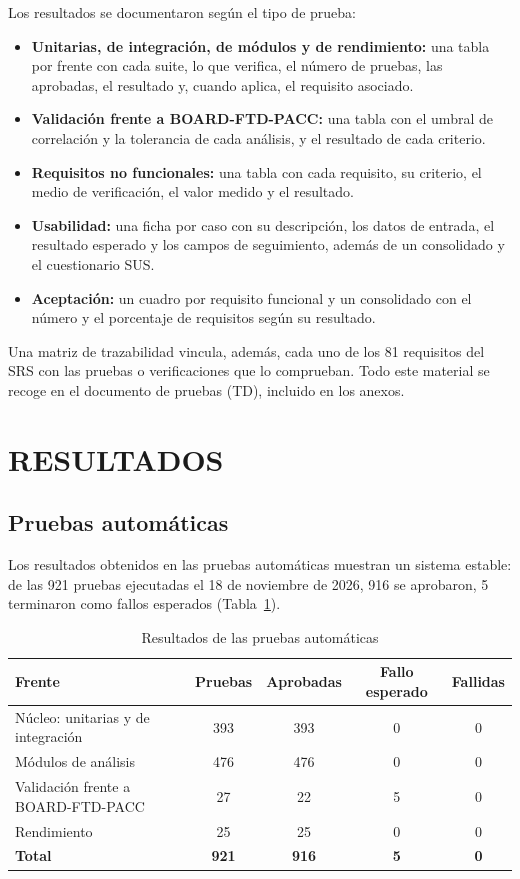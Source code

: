 \documentclass[12pt,letterpaper,oneside]{article}
\newcommand{\capitulo}[1]{\clearpage\section{#1}}
\begin{document}
Los resultados se documentaron según el tipo de prueba:

\begin{itemize}
  \item \textbf{Unitarias, de integración, de módulos y de rendimiento:} una tabla por frente con cada suite, lo que verifica, el número de pruebas, las aprobadas, el resultado y, cuando aplica, el requisito asociado.
  \item \textbf{Validación frente a BOARD-FTD-PACC:} una tabla con el umbral de correlación y la tolerancia de cada análisis, y el resultado de cada criterio.
  \item \textbf{Requisitos no funcionales:} una tabla con cada requisito, su criterio, el medio de verificación, el valor medido y el resultado.
  \item \textbf{Usabilidad:} una ficha por caso con su descripción, los datos de entrada, el resultado esperado y los campos de seguimiento, además de un consolidado y el cuestionario SUS.
  \item \textbf{Aceptación:} un cuadro por requisito funcional y un consolidado con el número y el porcentaje de requisitos según su resultado.
\end{itemize}

Una matriz de trazabilidad vincula, además, cada uno de los 81 requisitos del SRS con las pruebas o verificaciones que lo comprueban. Todo este material se recoge en el documento de pruebas (TD), incluido en los anexos.

\capitulo{RESULTADOS}

\subsection{Pruebas automáticas}
\label{sec:resultados_automaticas}

Los resultados obtenidos en las pruebas automáticas muestran un sistema estable: de las 921 pruebas ejecutadas el 18 de noviembre de 2026, 916 se aprobaron, 5 terminaron como fallos esperados (Tabla~\ref{tab:resultados_automaticas}).

\begin{table}[H]
\centering
\scriptsize
\renewcommand{\arraystretch}{1.3}
\begin{tabularx}{\textwidth}{|>{\raggedright\arraybackslash}X|c|c|c|c|}
\hline
\textbf{Frente} & \textbf{Pruebas} & \textbf{Aprobadas} & \textbf{Fallo esperado} & \textbf{Fallidas} \\
\hline
Núcleo: unitarias y de integración & 393 & 393 & 0 & 0 \\
\hline
Módulos de análisis & 476 & 476 & 0 & 0 \\
\hline
Validación frente a BOARD-FTD-PACC & 27 & 22 & 5 & 0 \\
\hline
Rendimiento & 25 & 25 & 0 & 0 \\
\hline
\textbf{Total} & \textbf{921} & \textbf{916} & \textbf{5} & \textbf{0} \\
\hline
\end{tabularx}
\caption{Resultados de las pruebas automáticas}
\label{tab:resultados_automaticas}
\end{table}
\end{document}
